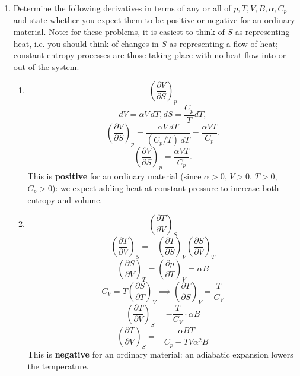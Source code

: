 \documentclass{article}
\begin{document}
\begin{enumerate}
        \\
        \[S = S(p,t), dS = \left(\frac{\partial S}{\partial T}\right)_p dT + \left(\frac{\partial S}{\partial p}\right)_T dp\]
        \[\left(\frac{\partial S}{\partial T}\right)_V = \left(\frac{\partial S}{\partial T}\right)_p + \left(\frac{\partial S}{\partial p}\right)_T \left(\frac{\partial p}{\partial T}\right)_V\]
        \[dV = \left(\frac{\partial V}{\partial T}\right)_p dT + \left(\frac{\partial V}{\partial p}\right)_T dp = 0 \implies \left(\frac{\partial p}{\partial T}\right)_V = -\frac{(\partial V/\partial T)_p}{(\partial V/\partial p)_T} = \frac{\alpha V}{V/B} = \alpha B\]
        \[\left(\frac{\partial S}{\partial T}\right)_V = \frac{C_p}{T} + (-\alpha V)(\alpha B) = \frac{C_p}{T} - \alpha^2 VB\]
        \[\boxed{C_V = T\left(\frac{\partial S}{\partial T}\right)_V = C_p - TV\alpha^2 B}\]    \item Determine the following derivatives in terms of any or all of $p,T,V,B,\alpha,C_p$ and state whether you expect them to be positive or negative for an ordinary material. Note: for these problems, it is easiest to think of $S$ as representing heat, i.e. you should think of changes in $S$ as representing a flow of heat; constant entropy processes are those taking place with no heat flow into or out of the system.
        \begin{enumerate}
            \item \[\left( \frac{\partial V}{\partial S}\right)_p\]
            \[dV = \alpha V\,dT, dS = \frac{C_p}{T}dT,\]
            \[\left(\frac{\partial V}{\partial S}\right)_p = \frac{\alpha V\,dT}{(C_p/T)\,dT} = \frac{\alpha VT}{C_p}.
            \]
            \[
                \boxed{\left(\frac{\partial V}{\partial S}\right)_p = \frac{\alpha VT}{C_p}.}
            \]
            This is \textbf{positive} for an ordinary material (since $\alpha>0$, $V>0$, $T>0$, $C_p>0$): we expect adding heat at constant pressure to increase both entropy and volume.

            \item \[\left( \frac{\partial T}{\partial V}\right)_S\]
        \[\left(\frac{\partial T}{\partial V}\right)_S = -\left(\frac{\partial T}{\partial S}\right)_V \left(\frac{\partial S}{\partial V}\right)_T\]
        \[\left(\frac{\partial S}{\partial V}\right)_T = \left(\frac{\partial p}{\partial T}\right)_V = \alpha B\]
        \[C_V = T\left(\frac{\partial S}{\partial T}\right)_V \implies \left(\frac{\partial T}{\partial S}\right)_V = \frac{T}{C_V}\]
        \[\left(\frac{\partial T}{\partial V}\right)_S = -\frac{T}{C_V} \cdot \alpha B\]
        \[\boxed{\left(\frac{\partial T}{\partial V}\right)_S = -\frac{\alpha BT}{C_p - TV\alpha^2B}}\]
        This is \textbf{negative} for an ordinary material: an adiabatic expansion lowers the temperature.
 

\end{enumerate}
\end{enumerate}
\end{document}
